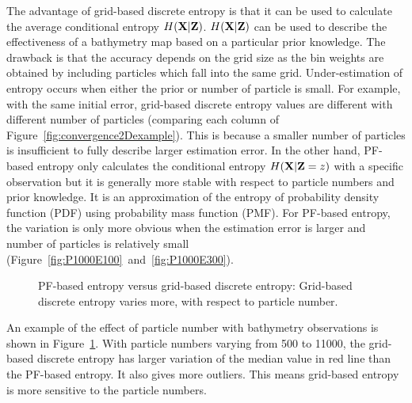 The advantage of grid-based discrete entropy is that it can be used to calculate the average conditional entropy $H({\bf X}|{\bf Z})$. $H({\bf X}|{\bf Z})$ can be used to describe the effectiveness of a bathymetry map based on a particular prior knowledge. The drawback is that the accuracy depends on the grid size as the bin weights are obtained by including particles which fall into the same grid. Under-estimation of entropy occurs when either the prior or number of particle is small. For example, with the same initial error, grid-based discrete entropy values are different with different number of particles (comparing each column of Figure~\ref{fig:convergence2Dexample}). This is because a smaller number of particles is insufficient to fully describe larger estimation error.  In the other hand, PF-based entropy only calculates the conditional entropy $H({\bf X}|{\bf Z}=z)$ with a specific observation but it is generally more stable with respect to particle numbers and prior knowledge. It is an approximation of the entropy of probability density function (PDF) using probability mass function (PMF). For PF-based entropy, the variation is only more obvious when the estimation error is larger and number of particles is relatively small (Figure~\ref{fig:P1000E100}~and~\ref{fig:P1000E300}). 



\begin{figure}[htbp]
\begin{center}
\caption{PF-based entropy versus grid-based discrete entropy: Grid-based discrete entropy varies more, with respect to particle number.}
\label{fig:NumOfParticls}
\end{center}
\end{figure}

An example of the effect of particle number with bathymetry observations is shown in Figure~\ref{fig:NumOfParticls}. With particle numbers varying from 500 to 11000, the grid-based discrete entropy has larger variation of the median value in red line than the PF-based entropy. It also gives more outliers. This means grid-based entropy is more sensitive to the particle numbers.

